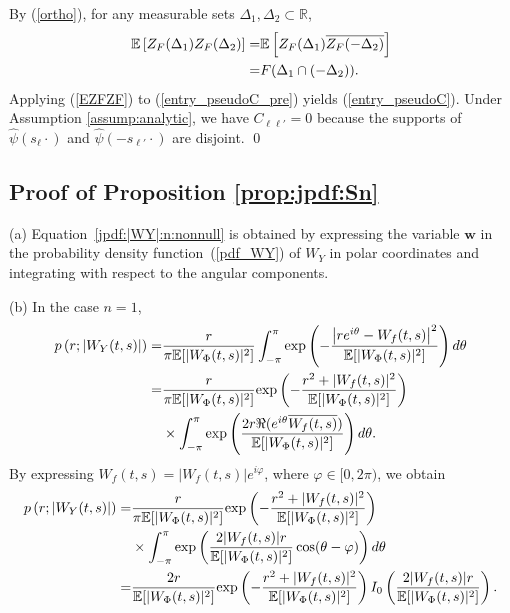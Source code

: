 \documentclass{amsart}
\begin{document}
By (\ref{ortho}), for any measurable sets $\Delta_{1},\Delta_{2}\subset \mathbb{R}$,
\begin{align}\notag
\mathbb{E}\left[Z_{F}(\Delta_{1})
Z_{F}(\Delta_{2})\right]=&
\mathbb{E}\left[Z_{F}(\Delta_{1})
\overline{Z_{F}(-\Delta_{2})}\right]
\\\label{EZFZF}=&
F(\Delta_{1}\cap(-\Delta_{2})).
\end{align}
Applying (\ref{EZFZF}) to (\ref{entry_pseudoC_pre}) yields (\ref{entry_pseudoC}).
Under Assumption \ref{assump:analytic}, we have $C_{\ell\ell'}=0$ because
the supports of $\widehat{\psi}(s_{\ell}\cdot)$ and $\widehat{\psi}(-s_{\ell'}\cdot)$
are disjoint.
\qed














\subsection{Proof of Proposition \ref{prop:jpdf:Sn}}\label{sec:proof:prop:jpdf:Sn}
(a) Equation~\eqref{jpdf:|WY|:n:nonnull} is obtained by expressing the variable $\mathbf{w}$
in the probability density function~(\ref{pdf_WY}) of $W_{Y}$ in polar coordinates and integrating with respect to the angular components.


(b) In the case $n=1$,
\begin{align}\notag
p\left(r;|W_{Y}(t,s)|\right)
= &\frac{r}{\pi \mathbb{E}[|W_{\Phi}(t,s)|^2]}
\int_{-\pi}^{\pi}\textup{exp}\left(-\frac{\left|re^{i\theta}-W_{f}(t,s)\right|^2}{\mathbb{E}[|W_{\Phi}(t,s)|^2]}\right)d\theta
\\\notag=&\frac{r}{\pi \mathbb{E}[|W_{\Phi}(t,s)|^2]}
\textup{exp}\left(-\frac{r^2+|W_{f}(t,s)|^2}{\mathbb{E}[|W_{\Phi}(t,s)|^2]}\right)
\\\notag&\times\int_{-\pi}^{\pi}\textup{exp}\left(\frac{2r\Re(e^{i\theta}\overline{W_{f}(t,s)})}{\mathbb{E}[|W_{\Phi}(t,s)|^2]}\right)
d\theta.
\end{align}
By expressing $W_{f}(t,s)=|W_{f}(t,s)|e^{i\varphi}$, where $\varphi\in [0,2\pi)$, we obtain
\begin{align}\notag
p\left(r;|W_{Y}(t,s)|\right)
=&
\frac{r}{\pi \mathbb{E}[|W_{\Phi}(t,s)|^2]}
\textup{exp}\left(-\frac{r^2+|W_{f}(t,s)|^2}{\mathbb{E}[|W_{\Phi}(t,s)|^2]}\right)
\\\notag&\times\int_{-\pi}^{\pi}\textup{exp}\left(\frac{2|W_{f}(t,s)|r}{\mathbb{E}[|W_{\Phi}(t,s)|^2]}\cos(\theta-\varphi)\right)d\theta
\\\notag=&\frac{2r}{\mathbb{E}[|W_{\Phi}(t,s)|^2]}
\textup{exp}\left(-\frac{r^2+|W_{f}(t,s)|^2}{\mathbb{E}[|W_{\Phi}(t,s)|^2]}\right)
I_{0}\left(\frac{2|W_{f}(t,s)|r}{\mathbb{E}[|W_{\Phi}(t,s)|^2]}
\right).
\end{align}
\end{document}
